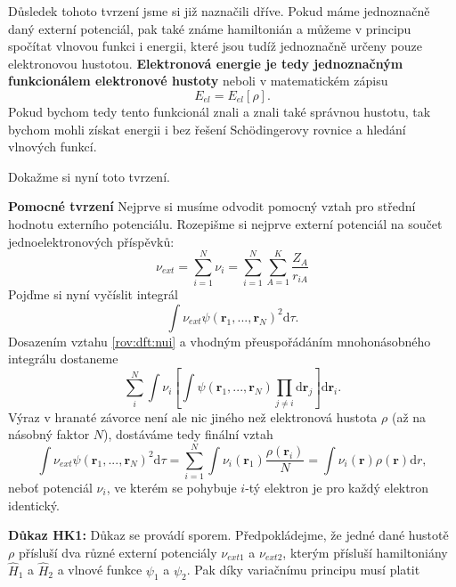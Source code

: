 \bigskip
Důsledek tohoto tvrzení jsme si již naznačili dříve. Pokud máme jednoznačně daný externí potenciál, pak také známe hamiltonián a můžeme v principu spočítat vlnovou funkci i energii, které jsou tudíž jednoznačně určeny pouze elektronovou hustotou. \textbf{Elektronová energie je tedy jednoznačným funkcionálem elektronové hustoty} neboli v matematickém zápisu
\begin{equation}
E_{el}=E_{el}[\rho] .
\end{equation}
Pokud bychom tedy tento funkcionál znali a znali také správnou hustotu, tak bychom mohli získat energii i bez řešení Sch\"{o}dingerovy rovnice a hledání vlnových funkcí.

\bigskip
Dokažme si nyní toto tvrzení. 

\textbf{Pomocné tvrzení} Nejprve si musíme odvodit pomocný vztah pro střední hodnotu externího potenciálu.
Rozepišme si nejprve externí potenciál na součet jednoelektronových příspěvků:
\begin{equation}
\nu_{ext}=\sum_{i=1}^N \nu_i = \sum_{i=1}^N \sum_{A=1}^K \frac{Z_A}{r_{iA}}  
\label{rov:dft:nui}
\end{equation}
Pojďme si nyní vyčíslit integrál
\begin{equation}
\int \nu_{ext} \psi(\textbf{r}_1,...,\textbf{r}_N)^2\mathrm{d}\tau .
\end{equation}
Dosazením vztahu \eqref{rov:dft:nui} a vhodným přeuspořádáním mnohonásobného integrálu dostaneme
\begin{equation}
\sum_i^N \int \nu_i \left[\int \psi(\mathbf{r}_1,...,\mathbf{r}_N)\prod_{j\neq i}\mathrm{d}\textbf{r}_j\right] \mathrm{d}\textbf{r}_i .
\end{equation}
Výraz v hranaté závorce není ale nic jiného než elektronová hustota $\rho$ (až na násobný faktor $N$), dostáváme tedy finální vztah
\begin{equation}
\int \nu_{ext} \psi(\textbf{r}_1,...,\textbf{r}_N)^2\mathrm{d}\tau = \sum_{i=1}^N \int \nu_i(\textbf{r}_1)\frac{\rho(\textbf{r}_i)}{N}= \int \nu_i(\textbf{r})\rho(\textbf{r}) \mathrm{d}r ,
\label{rov:dft:intnupsi}
\end{equation}
neboť potenciál $\nu_i$, ve kterém se pohybuje $i$-tý elektron je pro každý elektron identický.

\bigskip 
\textbf{Důkaz HK1:} Důkaz se provádí sporem. Předpokládejme, že jedné dané hustotě $\rho$ přísluší dva různé externí potenciály $\nu_{ext1}$ a $\nu_{ext2}$, kterým přísluší hamiltoniány $\hat{H}_1$ a $\hat{H}_2$ a vlnové funkce $\psi_1$ a $\psi_2$.  Pak díky variačnímu principu musí platit

